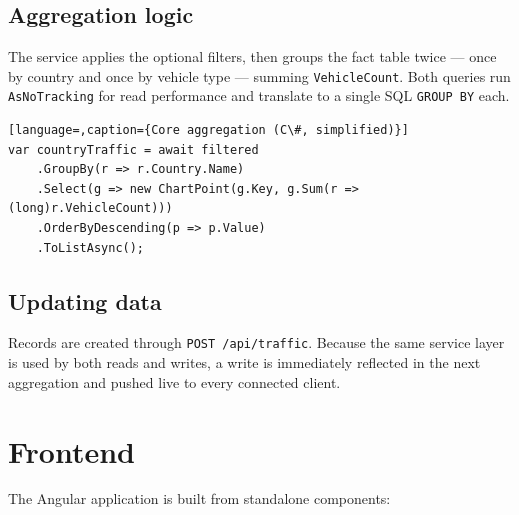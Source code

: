 \documentclass[11pt,a4paper]{article}
\newcommand{\code}[1]{\texttt{\small #1}}
\begin{document}
\subsection{Aggregation logic}
The service applies the optional filters, then groups the fact table twice ---
once by country and once by vehicle type --- summing \code{VehicleCount}. Both
queries run \code{AsNoTracking} for read performance and translate to a single
SQL \code{GROUP BY} each.

\begin{lstlisting}[language=,caption={Core aggregation (C\#, simplified)}]
var countryTraffic = await filtered
    .GroupBy(r => r.Country.Name)
    .Select(g => new ChartPoint(g.Key, g.Sum(r => (long)r.VehicleCount)))
    .OrderByDescending(p => p.Value)
    .ToListAsync();
\end{lstlisting}

\subsection{Updating data}
Records are created through \code{POST /api/traffic}. Because the same service
layer is used by both reads and writes, a write is immediately reflected in the
next aggregation and pushed live to every connected client.

\section{Frontend}
The Angular application is built from standalone components:
\end{document}
